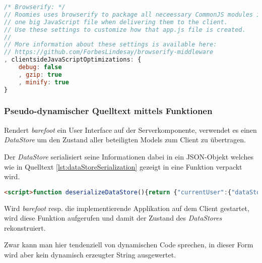 \begin{lstlisting}[language=JavaScript, firstnumber=95, caption={Konfiguration der browserify Middleware \cite{RoomiesExampleConfig}}, label=lst:configBrowserifyMiddleware]
/* Browserify: */
// Roomies uses browserify to package all neceessary CommonJS modules into
// one big JavaScript file when delivering them to the client.
// Use these settings to customize how that app.js file is created.
//
// More information about these settings is available here:
// https://github.com/ForbesLindesay/browserify-middleware
, clientsideJavaScriptOptimizations: {
	debug: false
	, gzip: true
	, minify: true
}
\end{lstlisting}


\subsubsection*{Pseudo-dynamischer Quelltext mittels Funktionen}

Rendert \emph{barefoot} ein User Interface auf der Serverkomponente, verwendet es einen \emph{DataStore} \cite{barefootDatastore} um den Zustand aller beteiligten Models zum Client zu übertragen.

Der \emph{DataStore} serialisiert seine Informationen dabei in ein \gls{JSON}-Objekt welches wie in Quelltext \ref{lst:dataStoreSerialization} gezeigt in eine Funktion verpackt wird.

\begin{lstlisting}[language=HTML, caption={Ausschnitt eines von \emph{barefoot} serialisierten \emph{DataStores} im HTML Markup von \emph{Roomies}}, label={lst:dataStoreSerialization}]
<script>function deserializeDataStore(){return {"currentUser":{"dataStoreModelIdentifier":"ResidentModel","data":/* ... */[{"name":"BA abgeben","description":"","reward":5,"fulfilledAt":null,"dueDate":"2013-06-14T00:00:00.000Z","id":1,"createdAt":"2013-06-03T20:28:58.000Z","updatedAt":"2013-06-03T20:28:58.000Z","CommunityId":1,"creatorId":1,"fulfillorId":null}]}};}</script>
\end{lstlisting}

Wird \emph{barefoot} resp. die implementierende Applikation auf dem Client gestartet, wird diese Funktion aufgerufen und damit der Zustand des \emph{DataStores} rekonstruiert.

Zwar kann man hier tendenziell von dynamischen Code sprechen, in dieser Form wird aber kein dynamisch erzeugter String ausgewertet.



